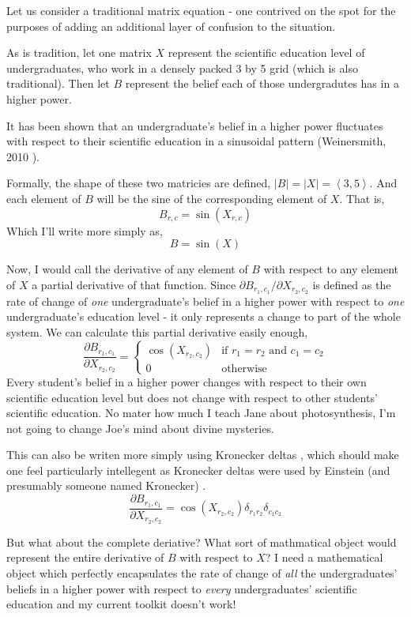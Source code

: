 \documentclass[12pt]{book}
\theoremstyle{definition}
\theoremstyle{plain}
\theoremstyle{ppart}
\theoremstyle{case}
\theoremstyle{solution}
\begin{document}
Let us consider a traditional matrix equation - one contrived on the spot for the
purposes of adding an additional layer of confusion to the situation.

As is tradition, let one matrix $X$ represent the scientific education level of
undergraduates, who work in a densely packed 3 by 5 grid (which is also traditional).
Then let $B$ represent the belief each of those undergradutes has in a higher power.

It has been shown that an undergraduate's belief in a higher power fluctuates with
respect to their scientific education in a sinusoidal pattern
(Weinersmith, 2010 \cite{weinersmith:education}).

Formally, the shape of these two matricies are defined,
$|B| = |X| = \left< 3,5 \right>$.
And each element of $B$ will be the sine of the corresponding element of
$X$. That is, \[B_{r,c} = \sin(X_{r,c})\]
Which I'll write more simply as, \[B = \sin(X)\]

Now, I would call the derivative of any element of $B$ with respect to any element
of $X$ a partial derivative of that function. Since
$\partial B_{r_1, c_1}/\partial X_{r_2, c_2}$ is defined as the rate of change of
\textit{one} undergraduate's belief in a higher power with respect to \textit{one}
undergraduate's education level - it only represents a change to part of the whole
system. 
We can calculate this partial derivative easily enough,
\[
\frac{\partial B_{r_1,c_1}}{\partial X_{r_2,c_2}} = 
\left\{
  \begin{array}{ll}
    \cos(X_{r_2,c_2})  & \mbox{if } r_1 = r_2 \mbox{ and } c_1 = c_2 \\
    0 & \mbox{otherwise}
  \end{array}
\right.
\]
Every student's belief in a higher power changes with respect to their own
scientific education level but does not change with respect to other students'
scientific education. No mater how much I teach Jane about photosynthesis, I'm
not going to change Joe's mind about divine mysteries.

This can also be writen more simply using Kronecker deltas \cite{wiki:kronecker},
which should make one feel particularly intellegent as Kronecker deltas were used
by Einstein (and presumably someone named Kronecker) \cite{wiki:einstein}.
\[
\frac{\partial B_{r_1,c_1}}{\partial X_{r_2,c_2}} = 
\cos (X_{r_2, c_2}) \delta_{r_1 r_2} \delta_{c_1 c_2}
\]

But what about the complete deriative?
What sort of mathmatical object would represent the entire derivative
of $B$ with respect to $X$?
I need a mathematical object which perfectly
encapsulates the rate of change of \textit{all} the undergraduates' beliefs in a
higher power with respect to \textit{every} undergraduates' scientific education
and my current toolkit doesn't work!
\end{document}
